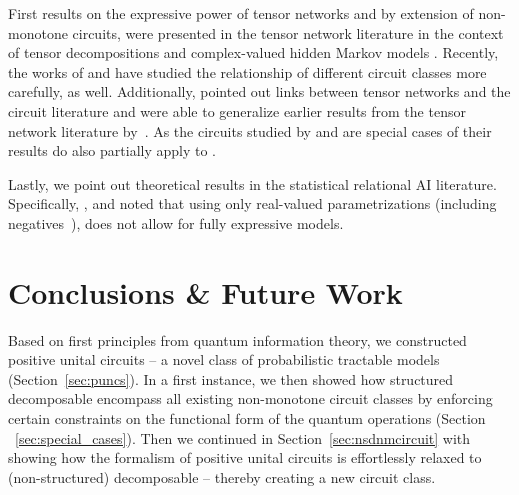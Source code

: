First results on the expressive power of tensor networks and by extension of non-monotone circuits, were presented in the tensor network literature in the context of tensor decompositions \citep{glasser2019expressive} and complex-valued hidden Markov models \citep{gao2022enhancing}. Recently, the works of \citet{loconte2024subtractive,loconte2025sum} and \citet{wangrelationship} have studied the relationship of different circuit classes more carefully, as well. Additionally, \citet{loconte2025sum} pointed out links between tensor networks and the circuit literature and were able to generalize earlier results from the tensor network literature by~\citet{glasser2019expressive}.
As the circuits studied by \citet{loconte2025sum} and \citet{wangrelationship} are special cases of \dpuncs their results do also partially apply to \dpuncs.


Lastly, we point out theoretical results in the statistical relational AI literature. Specifically, \citet{buchman2017rules}, and \citet{kuzelka2020complex} noted that using only real-valued parametrizations (including negatives~\citep{buchman2017negative}), does not allow for fully expressive models.

































\section{Conclusions \& Future Work}
\label{sec:conclusions}

Based on first principles from quantum information theory, we constructed positive unital circuits -- a novel class of probabilistic tractable models (Section~\ref{sec:puncs}).
In a first instance, we then showed how structured decomposable \puncs encompass all existing non-monotone circuit classes by enforcing certain constraints on the functional form of the quantum operations (Section ~\ref{sec:special_cases}).
Then we continued in Section~\ref{sec:nsdnmcircuit} with showing how the formalism of
positive unital circuits is effortlessly relaxed to (non-structured) decomposable \puncs -- thereby creating a new circuit class.

